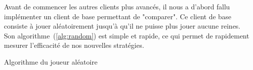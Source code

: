 Avant de commencer les autres clients plus avancés, il nous a d'abord
fallu implémenter un client de base permettant de "comparer". Ce client de base
consiste à jouer aléatoirement jusqu'à qu'il ne puisse plus jouer aucune reines.
Son algorithme~(\ref{alg:random}) est simple et rapide, ce qui permet de rapidement
mesurer l'efficacité de nos nouvelles stratégies.

\begin{algorithm}[H]
	\caption{Algorithme du joueur aléatoire}
	\label{alg:random}
\end{algorithm}